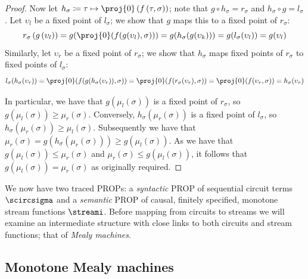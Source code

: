 \documentclass{lmcs}
\begin{document}
\begin{proof}
    Now let \(
    h_\sigma \coloneqq \tau
    \mapsto
    \proj{0}\left(f\left(\tau, \sigma\right)\right)
    \); note that
    \(g \circ h_\sigma = r_\sigma\)
    and
    \(h_\sigma \circ g = l_\sigma\).
    Let \(\upsilon_l\) be a fixed point of \(l_\sigma\); we show that
    \(g\) maps this to a fixed point of \(r_\sigma\):
    \[
        r_\sigma\left(g\left(\upsilon_l\right)\right)
        =
        g\mleft(\proj{0}\mleft(f\mleft(g\mleft(\upsilon_l\mright), \sigma\mright)\mright)\mright)
        =
        g\mleft(h_\sigma\mleft(g\mleft(\upsilon_k\mright)\mright)\mright)
        =
        g\mleft(l_\sigma\mleft(\upsilon_l\mright)\mright)
        =
        g\mleft(\upsilon_l\mright)
    \]
    Similarly, let \(\upsilon_r\) be a fixed point of \(r_\sigma\);
    we show that \(h_\sigma\) maps fixed points of \(r_\sigma\) to fixed
    points of \(l_\sigma\):
    \[
        l_\sigma\mleft(h_\sigma\mleft(\upsilon_r\mright)\mright)
        =
        \proj{0}\mleft(f\mleft(g\mleft(h_\sigma\mleft(\upsilon_r\mright)\mright), \sigma\mright)\mright)
        =
        \proj{0}\mleft(f\mleft(r_\sigma\mleft(\upsilon_r\mright), \sigma\mright)\mright)
        =
        \proj{0}\mleft(f\mleft(\upsilon_r, \sigma\mright)\mright)
        =
        h_\sigma\mleft(\upsilon_r\mright)
    \]

    In particular, we have that \(g\left(\mu_l(\sigma)\right)\) is a fixed point
    of \(r_\sigma\), so \(g(\mu_l(\sigma)) \geq \mu_r(\sigma)\).
    Conversely, \(h_\sigma(\mu_r(\sigma))\) is a fixed point of \(l_\sigma\),
    so \(h_\sigma(\mu_r(\sigma)) \geq \mu_l(\sigma)\).
    Subsequently we have that
    \(\mu_r(\sigma) = g(h_\sigma(\mu_r(\sigma))) \geq g(\mu_l(\sigma))\).
    As we have that
    \(g(\mu_l(\sigma)) \leq \mu_r(\sigma)\)
    and
    \(\mu_r(\sigma) \leq g(\mu_l(\sigma))\),
    it follows that
    \(g(\mu_l(\sigma)) = \mu_r(\sigma)\) as originally required.
\end{proof}

We now have two traced PROPs: a \emph{syntactic} PROP of sequential circuit
terms \(\scircsigma\) and a \emph{semantic} PROP of causal, finitely
specified, monotone stream functions \(\streami\).
Before mapping from circuits to streams we will examine an intermediate
structure with close links to both circuits and stream functions; that of
\emph{Mealy machines}.

\subsection{Monotone Mealy machines}\label{sec:mealy}
\end{document}
